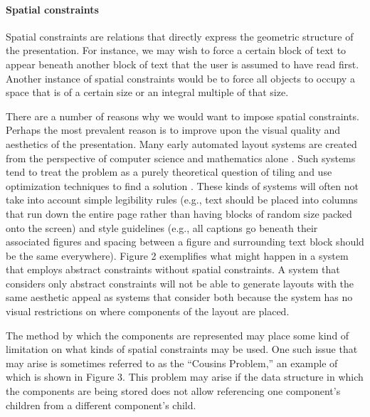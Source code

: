      \paragraph{Spatial constraints}
      \label{spatialcon}

      Spatial constraints are relations that directly express the geometric
      structure of the presentation. For instance, we may wish to force a certain
      block of text to appear beneath another block of text that the user is
      assumed to have read first. Another instance of spatial constraints would
      be to force all objects to occupy a space that is of a certain size or an
      integral multiple of that size.

      There are a number of reasons why we would want to impose spatial
      constraints. Perhaps the most prevalent reason is to improve upon the
      visual quality and aesthetics of the presentation. Many early automated
      layout systems are created from the perspective of computer science and
      mathematics alone \citep{beach-1}. Such systems tend to treat the problem
      as a purely theoretical question of tiling and use optimization techniques
      to find a solution \citep{luders-1}. These kinds of systems will often not
      take into account simple legibility rules (e.g., text should be placed into
      columns that run down the entire page rather than having blocks of random
      size packed onto the screen) and style guidelines (e.g., all captions go
      beneath their associated figures and spacing between a figure and
      surrounding text block should be the same everywhere). Figure 2 exemplifies
      what might happen in a system that employs abstract constraints without
      spatial constraints. A system that considers only abstract constraints will
      not be able to generate layouts with the same aesthetic appeal as systems
      that consider both because the system has no visual restrictions on where
      components of the layout are placed.

      The method by which the components are represented may place some kind of
      limitation on what kinds of spatial constraints may be used. One such issue
      that may arise is sometimes referred to as the “Cousins Problem,” an
      example of which is shown in Figure 3. This problem may arise if the data
      structure in which the components are being stored does not allow
      referencing one component’s children from a different component’s child.


